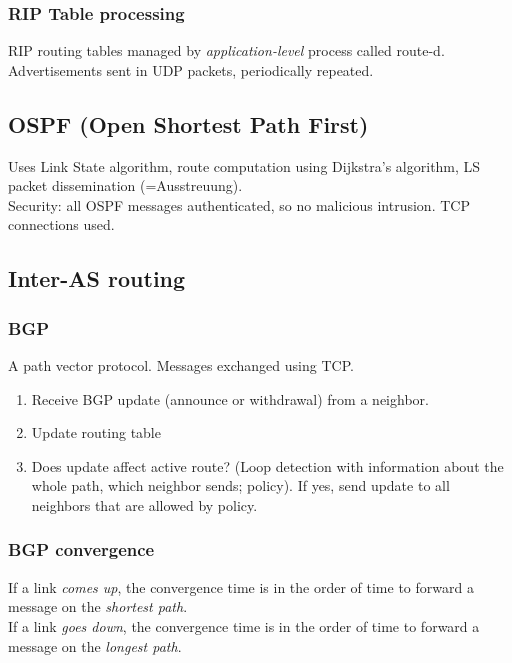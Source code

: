 \documentclass[10pt, a4paper, twocolumn]{scrartcl}
\begin{document}
\subsubsection{RIP Table processing}

RIP routing tables managed by \textit{application-level} process called route-d. Advertisements sent in UDP packets, periodically repeated.

\subsection{OSPF (Open Shortest Path First)}

Uses Link State algorithm, route computation using Dijkstra's algorithm, LS packet dissemination (=Ausstreuung).\\

Security: all OSPF messages authenticated, so no malicious intrusion. TCP connections used.

\subsection{Inter-AS routing}

\subsubsection{BGP}

A path vector protocol. Messages exchanged using TCP.

\begin{enumerate}
	\item Receive BGP update (announce or withdrawal) from a neighbor.
	\item Update routing table
	\item Does update affect active route? (Loop detection with information about the whole path, which neighbor sends; policy). If yes, send update to all neighbors that are allowed by policy.
\end{enumerate}

\subsubsection{BGP convergence}

If a link \textit{comes up}, the convergence time is in the order of time to forward a message on the \textit{shortest path}.\\

If a link \textit{goes down}, the convergence time is in the order of time to forward a message on the \textit{longest path}.\\
\end{document}
